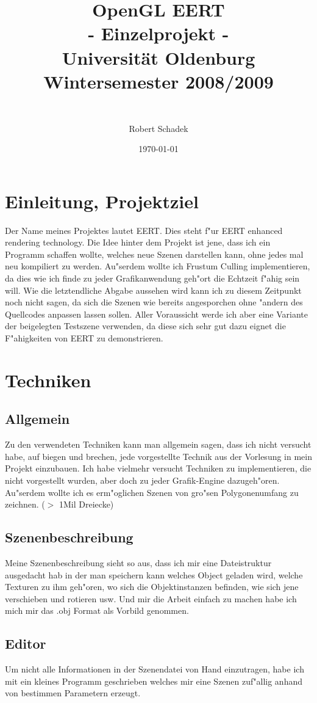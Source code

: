 \documentclass[a4paper,titlepage]{article}
\title{
	{\huge OpenGL EERT\\
	\huge - Einzelprojekt -\\
	{\large Universit\"at Oldenburg}\\
	\large Wintersemester 2008/2009\\
	}
	\date{\today}
	\author{\\
		\large 	Robert Schadek\\
	}
}
\begin{document}
\maketitle
\tableofcontents
\section{Einleitung, Projektziel}
Der Name meines Projektes lautet EERT. Dies steht f"ur EERT enhanced rendering technology.
Die Idee hinter dem Projekt ist jene, dass ich ein Programm schaffen wollte, welches neue
Szenen darstellen kann, ohne jedes mal neu kompiliert zu werden. Au"serdem wollte ich Frustum Culling
implementieren, da dies wie ich finde zu jeder Grafikanwendung geh"ort die Echtzeit f"ahig 
sein will. Wie die letztendliche Abgabe aussehen wird kann ich zu diesem Zeitpunkt noch nicht sagen, 
da sich die Szenen wie bereits angesporchen ohne "andern des Quellcodes anpassen lassen sollen. 
Aller Voraussicht werde ich aber eine Variante der beigelegten Testszene verwenden, da diese sich sehr gut
dazu eignet die F"ahigkeiten von EERT zu demonstrieren.
\section{Techniken}
\subsection{Allgemein}
Zu den verwendeten Techniken kann man allgemein sagen, dass ich nicht versucht habe, auf biegen und brechen, 
jede vorgestellte Technik aus der Vorlesung in mein Projekt einzubauen. Ich habe vielmehr versucht Techniken 
zu implementieren, die nicht vorgestellt wurden, aber doch zu jeder Grafik-Engine dazugeh"oren. Au"serdem 
wollte ich es erm"oglichen Szenen von gro"sen Polygonenumfang zu zeichnen. ($>$ 1Mil Dreiecke)

\subsection{Szenenbeschreibung}
Meine Szenenbeschreibung sieht so aus, dass ich mir eine Dateistruktur ausgedacht hab in der man speichern 
kann welches Object geladen wird, welche Texturen zu ihm geh"oren, wo sich die Objektinstanzen befinden, wie 
sich jene verschieben und rotieren usw. Und mir die Arbeit einfach zu machen habe ich mich mir das .obj Format 
als Vorbild genommen.

\subsection{Editor} 
Um nicht alle Informationen in der Szenendatei von Hand einzutragen, habe ich mit ein kleines Programm 
geschrieben welches mir eine Szenen zuf"allig anhand von bestimmen Parametern erzeugt.
\end{document}
